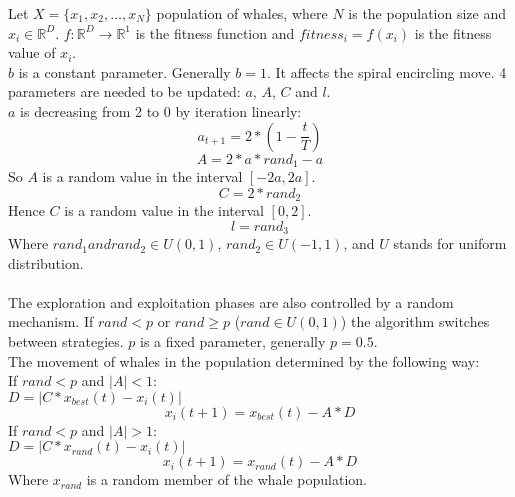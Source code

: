 \documentclass[border=0.2cm]{report}
\newcommand{\R}{\mathbb{R}} %
\begin{document}
\noindent
Let $X=\{x_1,x_2,\ldots,x_N\}$ population of whales, where $N$ is the population size and $x_i \in \R^D$.
$f: \R^{D}\to\R^1$ is the fitness function and $fitness_i=f(x_i)$ is the fitness value of $x_i$.\\
\noindent
$b$ is a constant parameter. Generally $b=1$. It affects the spiral encircling move.
4 parameters are needed to be updated: $a$, $A$, $C$ and $l$. \\
$a$ is decreasing from 2 to 0 by iteration linearly: \\
\begin{equation}\label{eqn_woa_a_param}
a_{t+1}=2*(1-\frac{t}{T}) 
\end{equation}
\begin{equation}\label{eqn_woa_A_param}
A=2*a*rand_{1}-a
\end{equation}
So $A$ is a random value in the interval $[-2a,2a]$. \\
\begin{equation}\label{eqn_woa_C_param}
C=2*rand_{2}
\end{equation}
Hence $C$ is a random value in the interval $[0,2]$. \\
\begin{equation}\label{eqn_woa_l_param}
l=rand_{3}
\end{equation}
Where $rand_1 and rand_2 \in U(0, 1)$, $rand_2 \in U(-1, 1)$, and $U$ stands for uniform distribution. \\ \\
The exploration and exploitation phases are also controlled by a random mechanism. If $rand<p$ or $rand\geq p$ ($rand \in U(0, 1)$) the algorithm switches between strategies. $p$ is a fixed parameter, generally $p=0.5$.\\
The movement of whales in the population determined by the following way: \\
If $rand<p$ and $|A|<1$: \\
$D=|C*x_{best}(t)-x_i(t)|$ \\
\begin{equation}\label{eqn_woa_exploit_step}
x_i(t+1)=x_{best}(t)-A*D
\end{equation}
If $rand<p$ and $|A|>1$: \\
$D=|C*x_{rand}(t)-x_i(t)|$ \\
\begin{equation}\label{eqn_woa_explore_step}
x_i(t+1)=x_{rand}(t)-A*D
\end{equation}
Where $x_{rand}$ is a random member of the whale population. \\
\end{document}
